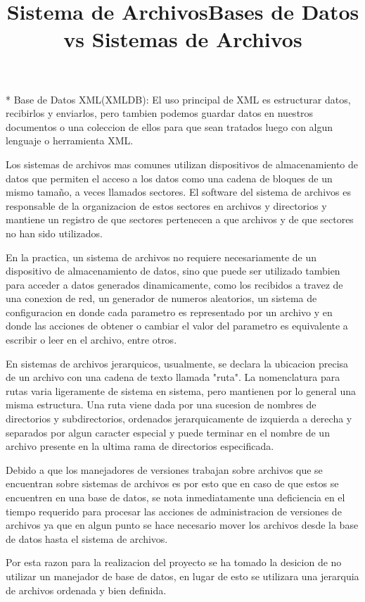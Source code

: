 * Base de Datos XML(XMLDB): El uso principal de XML es estructurar datos, recibirlos y enviarlos, pero tambien podemos guardar datos en nuestros documentos o una coleccion de ellos para que sean tratados luego con algun lenguaje o herramienta XML.

\title{Sistema de Archivos}

Los sistemas de archivos mas comunes utilizan dispositivos de almacenamiento de datos que permiten el acceso a los datos como una cadena de bloques de un mismo tamaño, a veces llamados sectores. El software del sistema de archivos es responsable de la organizacion de estos sectores en archivos y directorios y mantiene un registro de que sectores pertenecen a que archivos y de que sectores no han sido utilizados.

En la practica, un sistema de archivos no requiere necesariamente de un dispositivo de almacenamiento de datos, sino que puede ser utilizado tambien para acceder a datos generados dinamicamente, como los recibidos a travez de una conexion de red, un generador de numeros aleatorios, un sistema de configuracion en donde cada parametro es representado por un archivo y en donde las acciones de obtener o cambiar el valor del parametro es equivalente a escribir o leer en el archivo, entre otros.

En sistemas de archivos jerarquicos, usualmente, se declara la ubicacion precisa de un archivo con una cadena de texto llamada "ruta". La nomenclatura para rutas varia ligeramente de sistema en sistema, pero mantienen por lo general una misma estructura. Una ruta viene dada por una sucesion de nombres de directorios y subdirectorios, ordenados jerarquicamente de izquierda a derecha y separados por algun caracter especial y puede terminar en el nombre de un archivo presente en la ultima rama de directorios especificada.

\title{Bases de Datos vs Sistemas de Archivos}

Debido a que los manejadores de versiones trabajan sobre archivos que se encuentran sobre sistemas de archivos es por esto que en caso de que estos se encuentren en una base de datos, se nota inmediatamente una deficiencia en el tiempo requerido para procesar las acciones de administracion de versiones de archivos ya que en algun punto se hace necesario mover los archivos desde la base de datos hasta el sistema de archivos.

Por esta razon para la realizacion del proyecto se ha tomado la desicion de no utilizar un manejador de base de datos, en lugar de esto se utilizara una jerarquia de archivos ordenada y bien definida.
